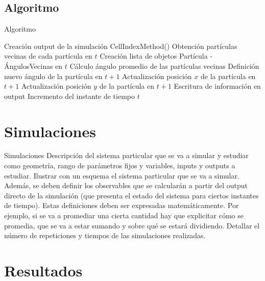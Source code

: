 \documentclass{beamer}
\begin{document}
    \subsection{Algoritmo}
    \begin{frame}{Algoritmo}
        \begin{algorithmic}[1]
            \small
            \State Creación output de la simulación
                \State CellIndexMethod()
                \State Obtención partículas vecinas de cada partícula en $t$
                \State Creación lista de objetos Partícula - ÁngulosVecinas en $t$
                    \State Cálculo ángulo promedio de las partículas vecinas
                    \State Definición nuevo ángulo de la partícula en $t+1$
                    \State Actualización posición $x$ de la partícula en $t+1$
                    \State Actualización posición $y$ de la partícula en $t+1$
                    \State Escritura de información en output
                \EndFor
                \State Incremento del instante de tiempo $t$
            \EndWhile
        \end{algorithmic}
        \label{alg:algorithm}

    \end{frame}


    \section{Simulaciones}

    \begin{frame}{Simulaciones}
        Descripción del sistema particular que se va a simular y estudiar como
        geometría, rango de parámetros fijos y variables, inputs y outputs a estudiar. Ilustrar con un
        esquema el sistema particular que se va a simular.
        Además, se deben definir los observables que se calcularán a partir del output directo de la
        simulación (que presenta el estado del sistema para ciertos instantes de tiempo). Estas
        definiciones deben ser expresadas matemáticamente. Por ejemplo, si se va a promediar una cierta
        cantidad hay que explicitar cómo se promedia, que se va a estar sumando y sobre qué se estará
        dividiendo.
        Detallar el número de repeticiones y tiempos de las simulaciones realizadas.
    \end{frame}

    \section{Resultados}
\end{document}
